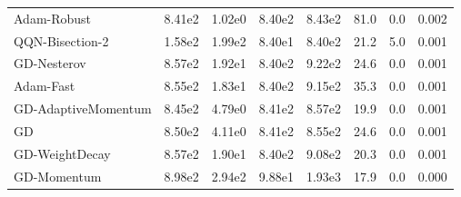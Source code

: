 \documentclass{article}
\begin{document}
\begin{table}[htbp]
{\begin{tabular}{p{2.5cm}*{7}{c}}
Adam-Robust & 8.41e2 & 1.02e0 & 8.40e2 & 8.43e2 & 81.0 & 0.0 & 0.002 \\
QQN-Bisection-2 & 1.58e2 & 1.99e2 & 8.40e1 & 8.40e2 & 21.2 & 5.0 & 0.001 \\
GD-Nesterov & 8.57e2 & 1.92e1 & 8.40e2 & 9.22e2 & 24.6 & 0.0 & 0.001 \\
Adam-Fast & 8.55e2 & 1.83e1 & 8.40e2 & 9.15e2 & 35.3 & 0.0 & 0.001 \\
GD-AdaptiveMomentum & 8.45e2 & 4.79e0 & 8.41e2 & 8.57e2 & 19.9 & 0.0 & 0.001 \\
GD & 8.50e2 & 4.11e0 & 8.41e2 & 8.55e2 & 24.6 & 0.0 & 0.001 \\
GD-WeightDecay & 8.57e2 & 1.90e1 & 8.40e2 & 9.08e2 & 20.3 & 0.0 & 0.001 \\
GD-Momentum & 8.98e2 & 2.94e2 & 9.88e1 & 1.93e3 & 17.9 & 0.0 & 0.000 \\
\bottomrule
\end{tabular}
}
\end{table}
\end{document}
